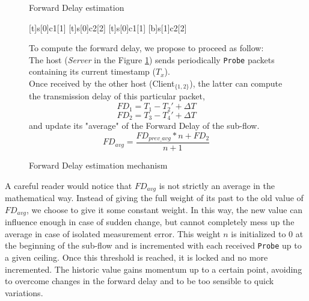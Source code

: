 \documentclass[11pt,a4paper,oldfontcommands]{memoir}
\begin{document}
\begin{figure}[!h]
\begin{minipage}[c]{.55\linewidth}
\begin{msc}[r]{Forward Delay estimation}

\setlength{\instfootheight}{0em}
\setlength{\instheadheight}{0em}
\setlength{\instdist}{0.25\linewidth}
\setlength{\levelheight}{3em}


[t]{s}[0]{c1}[1]
\nextlevel
{}[t]{s}[0]{c2}[2]
\nextlevel
{}[t]{s}[0]{c1}[1]
[b]{s}[1]{c2}[2]
\nextlevel
{}
\nextlevel
{}
\nextlevel
\end{msc}
\caption{Forward Delay estimation mechanism}
\label{fig:forwardDelayComputation}
\end{minipage}
\begin{minipage}[c]{.44\linewidth}
To compute the forward delay, we propose to proceed as follow:\\

The host (\textit{Server} in the Figure \ref{fig:forwardDelayComputation}) sends periodically \verb!Probe! packets containing its current timestamp ($T_x$).\\

Once received by the other host (Client$_{\{1,2\}}$), the latter can compute the transmission delay of this particular packet,
$$FD_1 = T_1 - T_2' + \Delta{}T$$
$$FD_2 = T_3 - T_4' + \Delta{}T$$
and update its "average" of the Forward Delay of the sub-flow.
$$FD_{avg} = \frac{FD_{prev\_avg} * n + FD_2}{n + 1}$$
\end{minipage}
\end{figure}

A careful reader would notice that $FD_{avg}$ is not strictly an average in the mathematical way. Instead of giving the full weight of its past to the old value of $FD_{avg}$, we choose to give it some constant weight. In this way, the new value can influence enough in case of sudden change, but cannot completely mess up the average in case of isolated measurement error. This weight $n$ is initialized to 0 at the beginning of the sub-flow and is incremented with each received \verb!Probe! up to a given ceiling. Once this threshold is reached, it is locked and no more incremented. The historic value gains momentum up to a certain point, avoiding to overcome changes in the forward delay and to be too sensible to quick variations.
\end{document}
